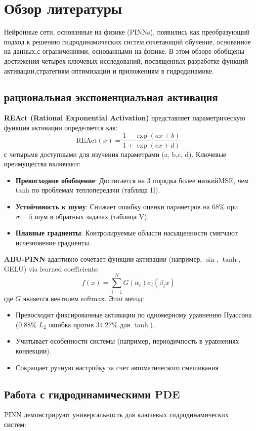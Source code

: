 \section*{Обзор литературы}
Нейронные сети, основанные на физике (PINNs), появились как преобразующий
подход к решению гидродинамических систем,сочетающий обучение, основанное
на данных,с ограничениями, основанными на физике. В этом обзоре обобщены
достижения четырех ключевых исследований, посвященных разработке функций
активации,стратегиям оптимизации и приложениям в гидродинамике.


\subsection{рациональная экспоненциальная активация}
\textbf{REAct (Rational Exponential Activation)} \cite{react} 
представляет параметрическую функция активации определяется как:
\[
\text{REAct}(x) = \frac{1 - \exp(ax + b)}{1 + \exp(cx + d)}
\]
с четырьмя доступными для изучения параметрами (a, b,c, d). Ключевые преимущества включают:
\begin{itemize}
    \item \textbf{Превосходное обобщение}: Достигается на 3 порядка более низкийMSE, чем
    tanh по проблемам теплопередачи (таблица II).
    \item \textbf{Устойчивость к шуму}: Снижает ошибку оценки параметров на 68\% при $\sigma=5$ шум в обратных задачах (таблица V).
    \item \textbf{Плавные градиенты}: Контролируемые области насыщенности смягчают исчезновение градиенты.
\end{itemize}

\textbf{ABU-PINN} \cite{abu_pinn} адаптивно сочетает функции активации (например, $\sin$, $\tanh$, GELU) via learned coefficients:
\[
f(x) = \sum_{i=1}^N G(\alpha_i) \sigma_i(\beta_i x)
\]
где $G$ является вентилем softmax. Этот метод:
\begin{itemize}
    \item Превосходит фиксированные активации по одномерному уравнению Пуассона (0.88\% $L_2$ ошибка против 34.27\% для $\tanh$).
    \item Учитывает особенности системы (например, периодичность в уравнениях конвекции).
    \item Сокращает ручную настройку за счет автоматического смешивания
\end{itemize}

\subsection{Работа с гидродинамическими PDE}
PINN демонстрируют универсальность для ключевых гидродинамических систем:

